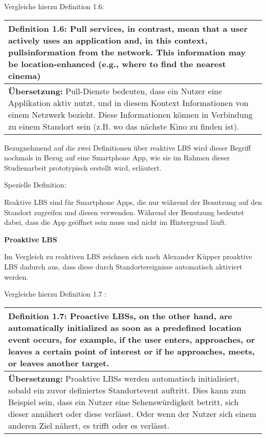 Vergleiche hierzu Definition 1.6:

\begin{table}[h]
	\centering
	\begin{tabular}{|p{16cm}|}\hline
		\textbf{Definition 1.6:} \glqq Pull services, in contrast, mean that a user actively uses an application and, in this context, \grqq pulls\grqq information from the network. This information may be location-enhanced (e.g., where to find the nearest cinema) \grqq \cite[S.20]{Schiller2004} \\ \hline
		\textbf{Übersetzung:} Pull-Dienste bedeuten, dass ein Nutzer eine Applikation aktiv nutzt, und in diesem Kontext Informationen von einem Netzwerk bezieht. Diese Informationen können in Verbindung zu einem Standort sein (z.B. wo das nächste Kino zu finden ist). \\ \hline
	\end{tabular}
\end{table}

Bezugnehmend auf die zwei Definitionen über reaktive LBS wird dieser Begriff nochmals in Bezug auf eine Smartphone App, wie sie im Rahmen dieser Studienarbeit prototypisch erstellt wird, erläutert.

Spezielle Definition: 

Reaktive LBS sind für Smartphone Apps, die nur während der Benutzung auf den Standort zugreifen und diesen verwenden. Während der Benutzung bedeutet dabei, dass die App geöffnet sein muss und nicht im Hintergrund läuft.


\textbf{Proaktive LBS}

Im Vergleich zu reaktiven LBS zeichnen sich nach Alexander Küpper proaktive LBS dadurch aus, dass diese durch Standortereignisse automatisch aktiviert werden.

Vergleiche hierzu Definition 1.7 :

\begin{table}[h]
	\centering
	\begin{tabular}{|p{16cm}|}\hline
		\textbf{Definition 1.7:} \glqq Proactive LBSs, on the other hand, are automatically initialized as soon as a predefined location event occurs, for example, if the user enters, approaches, or leaves a certain point of interest or if he approaches, meets, or leaves another target. \grqq \cite[S.3]{Kuepper2005} \\ \hline
		\textbf{Übersetzung:} Proaktive LBSs werden automatisch initialisiert, sobald ein zuvor definiertes Standortevent auftritt. Dies kann zum Beispiel sein, dass ein Nutzer eine Sehenswürdigkeit betritt, sich dieser annähert oder diese verlässt. Oder wenn der Nutzer sich einem anderen Ziel nähert, es trifft oder es verlässt. \\ \hline
	\end{tabular}
\end{table}



